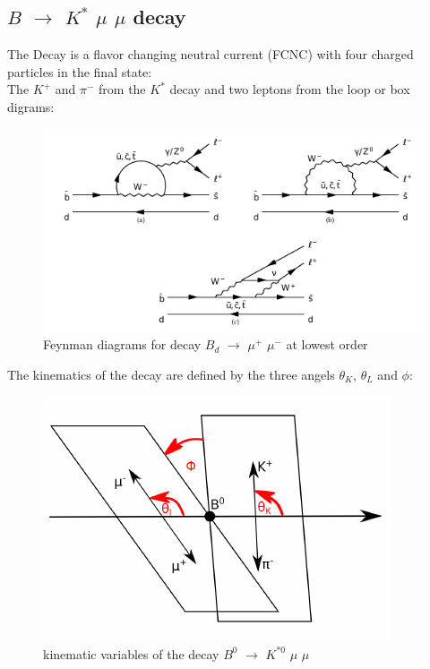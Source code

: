 \documentclass[english]{uzhpub}
\begin{document}
\subsection{$B$ $\rightarrow$ $K^{*}$ $\mu$ $\mu$ decay}
The Decay is a flavor changing neutral current (FCNC) with four charged particles in the final state: \\
The $K^+$ and $\pi^-$ from the $K^{*}$ decay and two leptons from the loop or box digrams:
\begin{figure}[H]
  \centering
  \includegraphics[width=0.8\linewidth]{KstarFeynman}
  \caption{Feynman diagrams for decay $B_d$ $\rightarrow$ $\mu^+$ $\mu^-$ at lowest order}
  \label{fig:Feynman}
\end{figure}
The kinematics of the decay are defined by the three angels $\theta_K$, $\theta_L$ and $\phi$:
\begin{figure}[H]
  \centering
  \includegraphics[width=0.6\linewidth]{angels}
  \caption{kinematic variables of the decay $B^0$ $\rightarrow$ $K^{*0}$ $\mu$ $\mu$}
  \label{fig:angels}
\end{figure}
\end{document}
